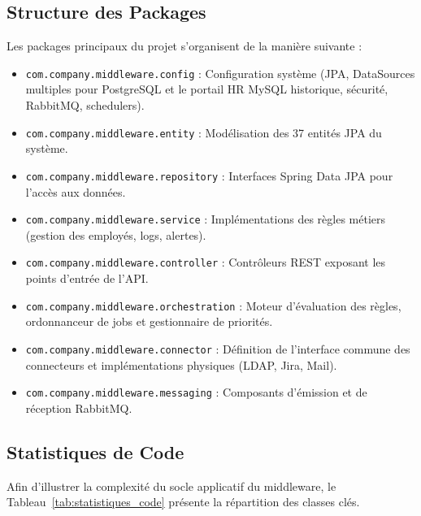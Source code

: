 \subsection{Structure des Packages}
Les packages principaux du projet s'organisent de la manière suivante :
\begin{itemize}
    \item \texttt{com.company.middleware.config} : Configuration système (JPA, DataSources multiples pour PostgreSQL et le portail HR MySQL historique, sécurité, RabbitMQ, schedulers).
    \item \texttt{com.company.middleware.entity} : Modélisation des 37 entités JPA du système.
    \item \texttt{com.company.middleware.repository} : Interfaces Spring Data JPA pour l'accès aux données.
    \item \texttt{com.company.middleware.service} : Implémentations des règles métiers (gestion des employés, logs, alertes).
    \item \texttt{com.company.middleware.controller} : Contrôleurs REST exposant les points d'entrée de l'API.
    \item \texttt{com.company.middleware.orchestration} : Moteur d'évaluation des règles, ordonnanceur de jobs et gestionnaire de priorités.
    \item \texttt{com.company.middleware.connector} : Définition de l'interface commune des connecteurs et implémentations physiques (LDAP, Jira, Mail).
    \item \texttt{com.company.middleware.messaging} : Composants d'émission et de réception RabbitMQ.
\end{itemize}

\subsection{Statistiques de Code}
Afin d'illustrer la complexité du socle applicatif du middleware, le Tableau~\ref{tab:statistiques_code} présente la répartition des classes clés.

